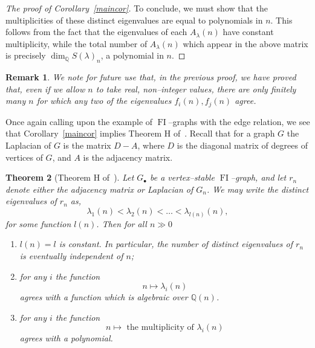 \documentclass[10pt]{amsart}
\DeclareMathOperator{\FI}{FI}
\newcommand{\Q}{\mathbb{Q}}
\newcommand{\dt}{\bullet}
\newtheorem{theorem}{Theorem}[section]
\newtheorem{remark}[theorem]{Remark}
\theoremstyle{definition}
\begin{document}
\begin{proof}[The proof of Corollary~\ref{maincor}]
To conclude, we must show that the multiplicities of these distinct eigenvalues are equal to polynomials in $n$. This follows from the fact that the eigenvalues of each $A_{\lambda}(n)$ have constant multiplicity, while the total number of $A_{\lambda}(n)$ which appear in the above matrix is precisely $\dim_\Q S(\lambda)_n$, a polynomial in $n$.
\end{proof}

\begin{remark}\label{canorder}
We note for future use that, in the previous proof, we have proved that, even if we allow $n$ to take real, non--integer values, there are only finitely many $n$ for which any two of the eigenvalues $f_i(n), f_j(n)$ agree.
\end{remark}


Once again calling upon the example of $\FI$--graphs with the edge relation, we see that Corollary~\ref{maincor} implies Theorem H of~\cite{RW}. Recall that for a graph $G$ the Laplacian of $G$ is the matrix $D-A$, where $D$ is the diagonal matrix of degrees of vertices of $G$, and $A$ is the adjacency matrix.

\begin{theorem}[Theorem H of~\cite{RW}]\label{rwthm}
Let $G_\dt$ be a vertex--stable $\FI$--graph, and let $r_n$ denote either the adjacency matrix or Laplacian of $G_n$. We may write the distinct eigenvalues of $r_n$ as,
\[
\lambda_1(n) < \lambda_2(n) < \dots< \lambda_{l(n)}(n),
\]
for some function $l(n)$. Then for all $n \gg 0$
\begin{enumerate}
\item\label{theo4.14_1} $l(n) = l$ is constant. In particular, the number of distinct eigenvalues of $r_n$ is eventually independent of $n$;
\item\label{theo4.14_2} for any $i$ the function
\[
n \mapsto \lambda_i(n)
\]
agrees with a function which is algebraic over $\Q(n)$.
\item\label{theo4.14_3} for any $i$ the function
\[
n \mapsto \text{ the multiplicity of $\lambda_i(n)$}
\]
agrees with a polynomial.
\end{enumerate}
\end{theorem}
\end{document}
